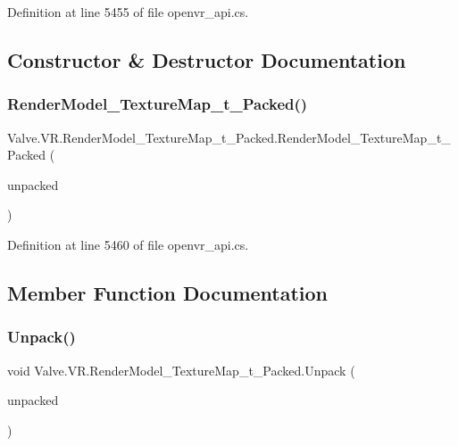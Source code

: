Definition at line 5455 of file openvr\+\_\+api.\+cs.



\subsection{Constructor \& Destructor Documentation}
\mbox{\label{struct_valve_1_1_v_r_1_1_render_model___texture_map__t___packed_a11fd82c91415d4544cb134689a333aff}} 
\subsubsection{\texorpdfstring{RenderModel\_TextureMap\_t\_Packed()}{RenderModel\_TextureMap\_t\_Packed()}}
{\footnotesize\ttfamily Valve.\+V\+R.\+Render\+Model\+\_\+\+Texture\+Map\+\_\+t\+\_\+\+Packed.\+Render\+Model\+\_\+\+Texture\+Map\+\_\+t\+\_\+\+Packed (\begin{DoxyParamCaption}\item[{\mbox{\hyperlink{struct_valve_1_1_v_r_1_1_render_model___texture_map__t}{Render\+Model\+\_\+\+Texture\+Map\+\_\+t}}}]{unpacked }\end{DoxyParamCaption})}



Definition at line 5460 of file openvr\+\_\+api.\+cs.



\subsection{Member Function Documentation}
\mbox{\label{struct_valve_1_1_v_r_1_1_render_model___texture_map__t___packed_ab427abd545c2c0df736ec1b6f4371082}} 
\subsubsection{\texorpdfstring{Unpack()}{Unpack()}}
{\footnotesize\ttfamily void Valve.\+V\+R.\+Render\+Model\+\_\+\+Texture\+Map\+\_\+t\+\_\+\+Packed.\+Unpack (\begin{DoxyParamCaption}\item[{ref \mbox{\hyperlink{struct_valve_1_1_v_r_1_1_render_model___texture_map__t}{Render\+Model\+\_\+\+Texture\+Map\+\_\+t}}}]{unpacked }\end{DoxyParamCaption})}



